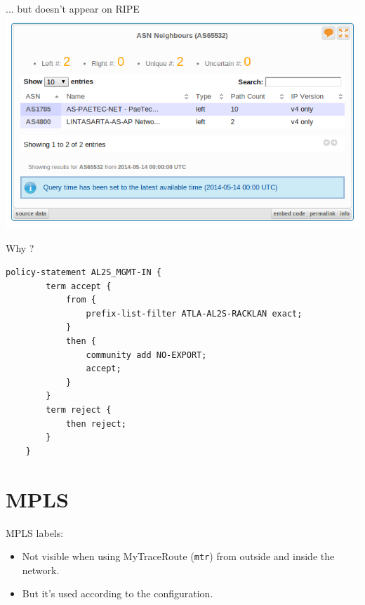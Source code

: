 \documentclass[usenames,dvipsnames]{beamer}
\begin{document}
\begin{frame}{... but doesn't appear on RIPE}
\includegraphics[width=\textwidth]{AS65532_neighbors.png}
\end{frame}

\begin{frame}[fragile]{Why ?}
\begin{lstlisting}
policy-statement AL2S_MGMT-IN {
        term accept {
            from {
                prefix-list-filter ATLA-AL2S-RACKLAN exact;
            }
            then {
                community add NO-EXPORT;
                accept;
            }
        }
        term reject {
            then reject;
        }
    }
\end{lstlisting}
\end{frame}

    


\section{MPLS}
\begin{frame}{\insertsection}

MPLS labels:
\begin{itemize}
	\item Not visible when using MyTraceRoute (\texttt{mtr}) from outside and inside the network.
    \item But it's used according to the configuration.
\end{itemize}

\end{frame}
\end{document}
